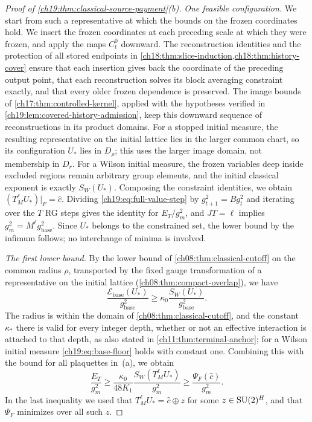 \begin{proof}[Proof of \cref{ch19:thm:classical-source-payment}(b)]
\emph{One feasible configuration.} We start from such a representative at which the bounds on the frozen coordinates hold. We insert the frozen coordinates at each preceding scale at which they were frozen, and apply the maps $C_t^0$ downward. The reconstruction identities and the protection of all stored endpoints in \cref{ch18:thm:slice-induction,ch18:thm:history-cover} ensure that each insertion gives back the coordinate of the preceding output point, that each reconstruction solves its block averaging constraint exactly, and that every older frozen dependence is preserved. The image bounds of \cref{ch17:thm:controlled-kernel}, applied with the hypotheses verified in \cref{ch19:lem:covered-history-admission}, keep this downward sequence of reconstructions in its product domains. For a stopped initial measure, the resulting representative on the initial lattice lies in the larger common chart, so its configuration $U_*$ lies in $D_\rho$; this uses the larger image domain, not membership in $D_r$. For a Wilson initial measure, the frozen variables deep inside excluded regions remain arbitrary group elements, and the initial classical exponent is exactly $S_W(U_*)$. Composing the constraint identities, we obtain $(T_M^\ell U_*)|_F=\widehat c$. Dividing \eqref{ch19:eq:full-value-step} by $g_{t+1}^2=Bg_t^2$ and iterating over the $T$ RG steps gives the identity for $E_T/g_m^2$, and $JT=\ell$ implies $g_m^2=M^\ell g_{\mathrm{base}}^2$. Since $U_*$ belongs to the constrained set, the lower bound by the infimum follows; no interchange of minima is involved.

\emph{The first lower bound.} By the lower bound of \cref{ch08:thm:classical-cutoff} on the common radius $\rho$, transported by the fixed gauge transformation of a representative on the initial lattice (\cref{ch08:thm:compact-overlap}), we have
\begin{equation}\label{ch19:eq:base-floor}
 \frac{\mathcal E_{\mathrm{base}}(U_*)}{g_{\mathrm{base}}^2}\ge\kappa_0\frac{S_W(U_*)}{g_{\mathrm{base}}^2}.
\end{equation}
The radius is within the domain of \cref{ch08:thm:classical-cutoff}, and the constant $\kappa_*$ there is valid for every integer depth, whether or not an effective interaction is attached to that depth, as also stated in \cref{ch11:thm:terminal-anchor}; for a Wilson initial measure \eqref{ch19:eq:base-floor} holds with constant one. Combining this with the bound for all plaquettes in~(a), we obtain
\[
 \frac{E_T}{g_m^2}\ge\frac{\kappa_0}{48K_1}\frac{S_W(T_M^\ell U_*)}{g_m^2}\ge\frac{\Psi_F(\widehat c)}{g_m^2}.
\]
In the last inequality we used that $T_M^\ell U_*=\widehat c\oplus z$ for some $z\in\mathrm{SU}(2)^H$, and that $\Psi_F$ minimizes over all such $z$.


\end{proof}
